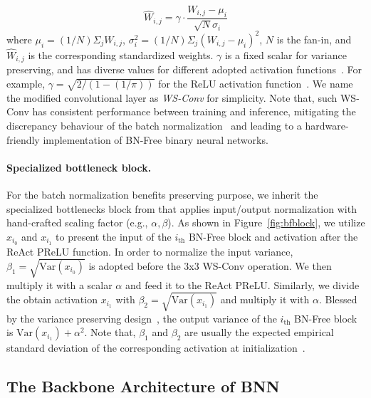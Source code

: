 \documentclass[final]{cvpr}
\begin{document}
\begin{equation}
\hat{W}_{i,j}=\gamma \cdot \frac{W_{i,j}-\mu_i}{\sqrt{N}\sigma_i}
\end{equation}
where $\mu_i=(1/N)\Sigma_j W_{i,j}$, $\sigma^2_i = (1/N)\Sigma_j(W_{i,j}-\mu_i)^2$, $N$ is the fan-in, and $\hat{W}_{i,j}$ is the corresponding standardized weights. $\gamma$ is a fixed scalar for variance preserving, and has diverse values for different adopted activation functions~\cite{brock2021characterizing}. For example, $\gamma=\sqrt{2/(1-(1/\pi))}$ for the ReLU activation function~\cite{arpit2016normalization}. We name the modified convolutional layer as \textit{WS-Conv} for simplicity. Note that, such WS-Conv has consistent performance between training and inference, mitigating the discrepancy behaviour of the batch normalization~\cite{brock2021agc} and leading to a hardware-friendly implementation of BN-Free binary neural networks.

\paragraph{Specialized bottleneck block.} For the batch normalization benefits preserving purpose, we inherit the specialized bottlenecks block from \cite{brock2021characterizing,brock2021agc} that applies input/output normalization with hand-crafted scaling factor (e.g., $\alpha,\beta$). As shown in Figure~\ref{fig:bfblock}, we utilize $x_{i_0}$ and $x_{i_1}$ to present the input of the $i_{\mathrm{th}}$ BN-Free block and activation after the ReAct PReLU function. In order to normalize the input variance, $\beta_1 = \sqrt{\mathrm{Var}(x_{i_0})}$ is adopted before the 3x3 WS-Conv operation. We then multiply it with a scalar $\alpha$ and feed it to the ReAct PReLU. Similarly, we divide the obtain activation $x_{i_1}$ with $\beta_2 = \sqrt{\mathrm{Var}(x_{i_1})}$ and multiply it with $\alpha$. Blessed by the variance preserving design~\cite{brock2021characterizing,brock2021agc}, the output variance of the $i_{\mathrm{th}}$ BN-Free block is $\mathrm{Var}(x_{i_1})+\alpha^2$. Note that, $\beta_1$ and $\beta_2$ are usually the expected empirical standard deviation of the corresponding activation at initialization~\cite{brock2021agc}.  

\subsection{The Backbone Architecture of BNN} \label{sec:bnn_arch}
\end{document}
